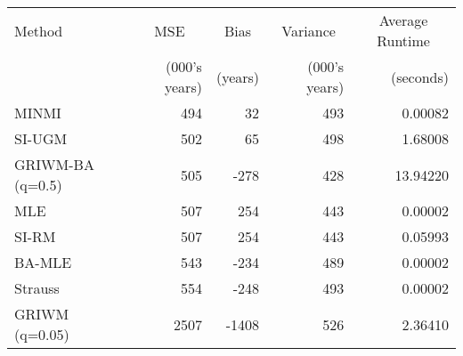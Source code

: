 
\begin{tabular}{lrrrr}
\toprule
\multicolumn{1}{l}{Method} & \multicolumn{1}{c}{MSE} & \multicolumn{1}{c}{Bias} & \multicolumn{1}{c}{Variance} & \multicolumn{1}{c}{Average Runtime} \\
 & (000's years) & (years) & (000's years) & (seconds)\\
\midrule
MINMI & 494 & 32 & 493 & 0.00082\\
SI-UGM & 502 & 65 & 498 & 1.68008\\
GRIWM-BA (q=0.5) & 505 & -278 & 428 & 13.94220\\
MLE & 507 & 254 & 443 & 0.00002\\
SI-RM & 507 & 254 & 443 & 0.05993\\
\addlinespace
BA-MLE & 543 & -234 & 489 & 0.00002\\
Strauss & 554 & -248 & 493 & 0.00002\\
GRIWM (q=0.05) & 2507 & -1408 & 526 & 2.36410\\
\bottomrule
\end{tabular}
